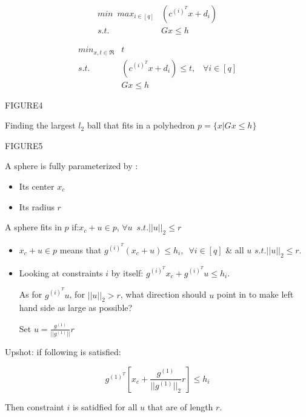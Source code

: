 \begin{example}
	\begin{align*}
	min \,\,\, max_{i\in [q]} &(c^{(i)^T}x + d_i)\\
	s.t. &Gx\leq h
	\end{align*}
	
	\begin{align*}
	min_{x, t\in \Re} &t\\
	s.t. &(c^{(i)^T}x + d_i)\leq t,\,\,\,\,\, \forall i\in [q]\\
	&Gx\leq h
	\end{align*}
	
	FIGURE4
\end{example}



\begin{example}
	Finding the largest $l_2$ ball that fits in a polyhedron $p = \{x| Gx\leq h \}$
	
	FIGURE5
\end{example}

A sphere is fully parameterized by :
\begin{itemize}
	\item Its center $x_c$
	
	\item Its radius $r$
\end{itemize}

A sphere fits in $p$ if:$x_c + u \in p$, $\forall u \,\,\, s.t. ||u||_2\leq r$


\begin{itemize}
	\item $x_c+u \in p$ means that $g^{(i)^T}(x_c + u) \leq h_i,\,\,\, \forall i\in [q]$ \& all $u$ $s.t. ||u||_2\leq r$.
	
	\item Looking at constraints $i$ by itself: $g^{({i})^T}x_c + g^{({i})^T}u \leq h_i$. 
	
	As for $g^{({i})^T}u$, for $||u||_2>r$, what direction should $u$ point in to make left hand side as large as possible?
	
	Set $u=\frac{g^{(1)}}{||g^{(1)}||}r$ 
\end{itemize}

Upshot: if following is satisfied:

\begin{equation*}
g^{(1)^T}[x_c + \frac{g^{(1)}}{||g^{(1)}||_2}r] \leq h_i
\end{equation*}

Then constraint $i$ is satidfied for all $u$ that are of length $r$.

